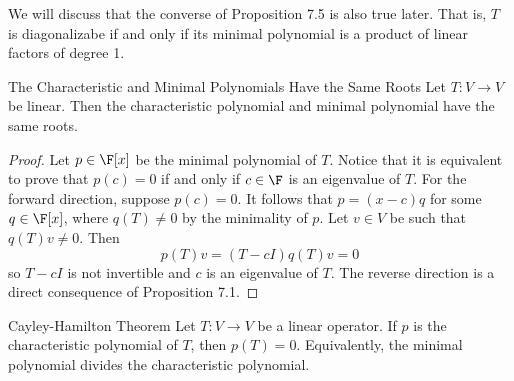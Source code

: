 \documentclass[linearalgebra]{subfiles}
\begin{document}
    \begin{remark}
        We will discuss that the converse of Proposition 7.5 is also true later. That is, $T$ is diagonalizabe if and only if its minimal polynomial is a product of linear factors of degree 1.
    \end{remark}

    \begin{prop}{The Characteristic and Minimal Polynomials Have the Same Roots}
        Let $T:V\to V$ be linear. Then the characteristic polynomial and minimal polynomial have the same roots.
    \end{prop}

    \begin{proof}
        Let $p\in\F[x]$ be the minimal polynomial of $T$. Notice that it is equivalent to prove that $p(c) = 0$ if and only if $c\in \F$ is an eigenvalue of $T$. For the forward direction, suppose $p(c) = 0$. It follows that $p = (x-c)q$ for some $q\in\F[x]$, where $q(T)\neq 0$ by the minimality of $p$. Let $v\in V$ be such that $q(T)v\neq 0$. Then
        \begin{equation*}
            p(T)v = (T-cI)q(T)v = 0
        \end{equation*}
        so $T-cI$ is not invertible and $c$ is an eigenvalue of $T$. The reverse direction is a direct consequence of Proposition 7.1.
    \end{proof}

    \begin{theorem}{Cayley-Hamilton Theorem}
        Let $T:V\to V$ be a linear operator. If $p$ is the characteristic polynomial of $T$, then $p(T) = 0$. Equivalently, the minimal polynomial divides the characteristic polynomial. 
    \end{theorem}
\end{document}
